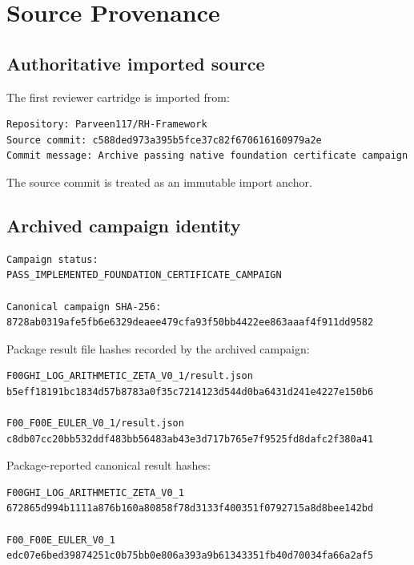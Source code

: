 \hypertarget{source-provenance}{%
\chapter{Source Provenance}\label{source-provenance}}

\hypertarget{authoritative-imported-source}{%
\section{Authoritative imported source}\label{authoritative-imported-source}}

The first reviewer cartridge is imported from:

\begin{verbatim}
Repository: Parveen117/RH-Framework
Source commit: c588ded973a395b5fce37c82f670616160979a2e
Commit message: Archive passing native foundation certificate campaign
\end{verbatim}

The source commit is treated as an immutable import anchor.

\hypertarget{archived-campaign-identity}{%
\section{Archived campaign identity}\label{archived-campaign-identity}}

\begin{verbatim}
Campaign status:
PASS_IMPLEMENTED_FOUNDATION_CERTIFICATE_CAMPAIGN

Canonical campaign SHA-256:
8728ab0319afe5fb6e6329deaee479cfa93f50bb4422ee863aaaf4f911dd9582
\end{verbatim}

Package result file hashes recorded by the archived campaign:

\begin{verbatim}
F00GHI_LOG_ARITHMETIC_ZETA_V0_1/result.json
b5eff18191bc1834d57b8783a0f35c7214123d544d0ba6431d241e4227e150b6

F00_F00E_EULER_V0_1/result.json
c8db07cc20bb532ddf483bb56483ab43e3d717b765e7f9525fd8dafc2f380a41
\end{verbatim}

Package-reported canonical result hashes:

\begin{verbatim}
F00GHI_LOG_ARITHMETIC_ZETA_V0_1
672865d994b1111a876b160a80858f78d3133f400351f0792715a8d8bee142bd

F00_F00E_EULER_V0_1
edc07e6bed39874251c0b75bb0e806a393a9b61343351fb40d70034fa66a2af5
\end{verbatim}

